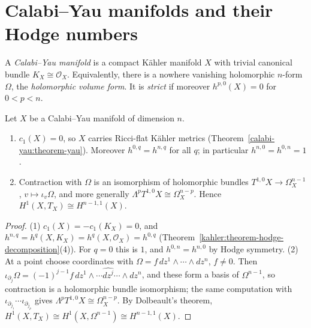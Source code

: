 \section{Calabi--Yau manifolds and their Hodge numbers}\label{calabi-yau:section-definition}

\begin{definition}\label{calabi-yau:definition-calabi-yau}
A \emph{Calabi--Yau manifold} is a compact K\"ahler manifold $X$ with trivial canonical bundle $K_X \cong \mathcal{O}_X$. Equivalently, there is a nowhere vanishing holomorphic
$n$-form $\Omega$, the \emph{holomorphic volume form}. It is \emph{strict} if moreover $h^{p,0}(X) = 0$ for $0 < p < n$.
\end{definition}

\begin{proposition}\label{calabi-yau:proposition-basic}
Let $X$ be a Calabi--Yau manifold of dimension $n$.
\begin{enumerate}
\item $c_1(X) = 0$, so $X$ carries Ricci-flat K\"ahler metrics (Theorem~\ref{calabi-yau:theorem-yau}). Moreover $h^{0,q} = h^{n,q}$ for all $q$; in particular
$h^{n,0} = h^{0,n} = 1$.
\item Contraction with $\Omega$ is an isomorphism of holomorphic bundles $T^{1,0}X \to \Omega^{n-1}_X$, $v \mapsto \iota_v\Omega$, and more generally
$\Lambda^pT^{1,0}X \cong \Omega^{n-p}_X$. Hence $H^1(X, T_X) \cong H^{n-1,1}(X)$.
\end{enumerate}
\end{proposition}

\begin{proof}
(1) $c_1(X) = -c_1(K_X) = 0$, and $h^{n,q} = h^q(X, K_X) = h^q(X, \mathcal{O}_X) = h^{0,q}$ (Theorem~\ref{kahler:theorem-hodge-decomposition}(4)). For $q = 0$ this is
$1$, and $h^{0,n} = h^{n,0}$ by Hodge symmetry. (2) At a point choose coordinates with $\Omega = f\,dz^1 \wedge \cdots \wedge dz^n$, $f \neq 0$. Then $\iota_{\partial_j}\Omega = (-1)^{j-1}f\,dz^1 \wedge \cdots \widehat{dz^j} \cdots \wedge dz^n$,
and these form a basis of $\Omega^{n-1}$, so contraction is a holomorphic bundle isomorphism; the same computation with $\iota_{\partial_{j_1}} \cdots \iota_{\partial_{j_p}}$
gives $\Lambda^pT^{1,0}X \cong \Omega^{n-p}_X$. By Dolbeault's theorem, $H^1(X, T_X) \cong H^1(X, \Omega^{n-1}) \cong H^{n-1,1}(X)$.
\end{proof}

